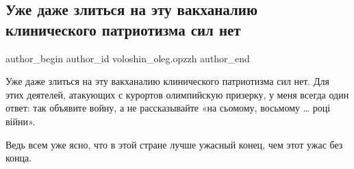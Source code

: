  
 
 
 
 
 
\subsection{Уже даже злиться на эту вакханалию клинического патриотизма сил нет}
\label{sec:09_08_2021.fb.voloshin_oleg.opzzh.1.maguchih}
 
\ifcmt
 author_begin
   author_id voloshin_oleg.opzzh
 author_end
\fi

Уже даже злиться на эту вакханалию клинического патриотизма сил нет. Для этих
деятелей, атакующих с курортов олимпийскую призерку, у меня всегда один ответ:
так объявите войну, а не рассказывайте «на сьомому, восьмому … році війни».

Ведь всем уже ясно, что в этой стране лучше ужасный конец, чем этот ужас без
конца.

